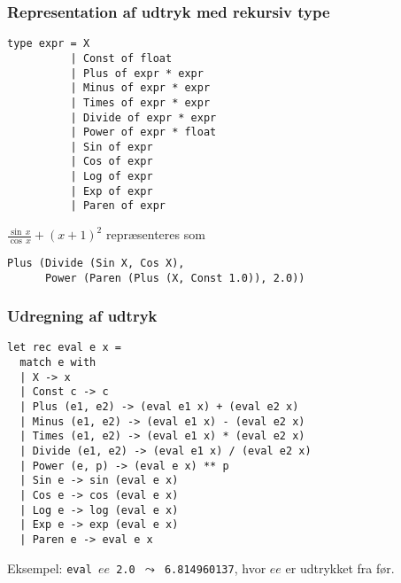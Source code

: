\documentclass{beamer}
\begin{document}
\begin{frame}[fragile=singleslide]
\frametitle{Representation af udtryk med rekursiv type}

\renewcommand{\baselinestretch}{0.9}
\begin{verbatim}
type expr = X
          | Const of float
          | Plus of expr * expr
          | Minus of expr * expr
          | Times of expr * expr
          | Divide of expr * expr
          | Power of expr * float
          | Sin of expr
          | Cos of expr
          | Log of expr
          | Exp of expr
          | Paren of expr
\end{verbatim}

\renewcommand{\baselinestretch}{1.0}

$\frac{\sin\,x}{\cos\,x}+(x+1)^2$ repræsenteres som

\begin{verbatim}
Plus (Divide (Sin X, Cos X),
      Power (Paren (Plus (X, Const 1.0)), 2.0))
\end{verbatim}


\end{frame}

\begin{frame}[fragile=singleslide]
\frametitle{Udregning af udtryk}


\renewcommand{\baselinestretch}{0.9}
\begin{verbatim}
let rec eval e x =
  match e with
  | X -> x
  | Const c -> c
  | Plus (e1, e2) -> (eval e1 x) + (eval e2 x)
  | Minus (e1, e2) -> (eval e1 x) - (eval e2 x)
  | Times (e1, e2) -> (eval e1 x) * (eval e2 x)
  | Divide (e1, e2) -> (eval e1 x) / (eval e2 x)
  | Power (e, p) -> (eval e x) ** p
  | Sin e -> sin (eval e x)
  | Cos e -> cos (eval e x)
  | Log e -> log (eval e x)
  | Exp e -> exp (eval e x)
  | Paren e -> eval e x
\end{verbatim}

Eksempel: \texttt{eval $ee$ 2.0 $\leadsto$ 6.814960137}, hvor $ee$ er
udtrykket fra før.

\end{frame}
\end{document}
